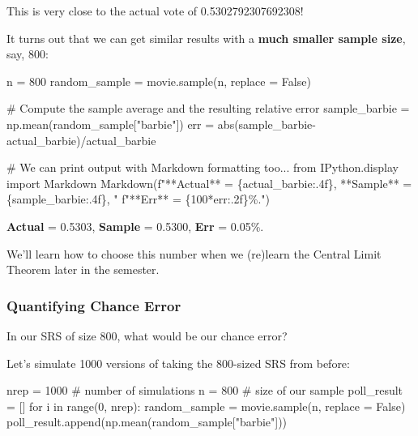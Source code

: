 \documentclass[
  letterpaper,
  DIV=11,
  numbers=noendperiod]{scrreprt}
\newenvironment{Shaded}{\begin{snugshade}}{\end{snugshade}}
\newcommand{\BuiltInTok}[1]{\textcolor[rgb]{0.00,0.23,0.31}{#1}}
\newcommand{\CommentTok}[1]{\textcolor[rgb]{0.37,0.37,0.37}{#1}}
\newcommand{\ControlFlowTok}[1]{\textcolor[rgb]{0.00,0.23,0.31}{#1}}
\newcommand{\DecValTok}[1]{\textcolor[rgb]{0.68,0.00,0.00}{#1}}
\newcommand{\ImportTok}[1]{\textcolor[rgb]{0.00,0.46,0.62}{#1}}
\newcommand{\KeywordTok}[1]{\textcolor[rgb]{0.00,0.23,0.31}{#1}}
\newcommand{\NormalTok}[1]{\textcolor[rgb]{0.00,0.23,0.31}{#1}}
\newcommand{\OperatorTok}[1]{\textcolor[rgb]{0.37,0.37,0.37}{#1}}
\newcommand{\SpecialCharTok}[1]{\textcolor[rgb]{0.37,0.37,0.37}{#1}}
\newcommand{\SpecialStringTok}[1]{\textcolor[rgb]{0.13,0.47,0.30}{#1}}
\newcommand{\StringTok}[1]{\textcolor[rgb]{0.13,0.47,0.30}{#1}}
\newcommand{\VariableTok}[1]{\textcolor[rgb]{0.07,0.07,0.07}{#1}}
\begin{document}
This is very close to the actual vote of 0.5302792307692308!

It turns out that we can get similar results with a \textbf{much smaller
sample size}, say, 800:

\begin{Shaded}
\begin{Highlighting}[]
\NormalTok{n }\OperatorTok{=} \DecValTok{800}
\NormalTok{random\_sample }\OperatorTok{=}\NormalTok{ movie.sample(n, replace }\OperatorTok{=} \VariableTok{False}\NormalTok{)}

\CommentTok{\# Compute the sample average and the resulting relative error}
\NormalTok{sample\_barbie }\OperatorTok{=}\NormalTok{ np.mean(random\_sample[}\StringTok{"barbie"}\NormalTok{])}
\NormalTok{err }\OperatorTok{=} \BuiltInTok{abs}\NormalTok{(sample\_barbie}\OperatorTok{{-}}\NormalTok{actual\_barbie)}\OperatorTok{/}\NormalTok{actual\_barbie}

\CommentTok{\# We can print output with Markdown formatting too...}
\ImportTok{from}\NormalTok{ IPython.display }\ImportTok{import}\NormalTok{ Markdown}
\NormalTok{Markdown(}\SpecialStringTok{f"**Actual** = }\SpecialCharTok{\{}\NormalTok{actual\_barbie}\SpecialCharTok{:.4f\}}\SpecialStringTok{, **Sample** = }\SpecialCharTok{\{}\NormalTok{sample\_barbie}\SpecialCharTok{:.4f\}}\SpecialStringTok{, "}
         \SpecialStringTok{f"**Err** = }\SpecialCharTok{\{}\DecValTok{100}\OperatorTok{*}\NormalTok{err}\SpecialCharTok{:.2f\}}\SpecialStringTok{\%."}\NormalTok{)}
\end{Highlighting}
\end{Shaded}

\textbf{Actual} = 0.5303, \textbf{Sample} = 0.5300, \textbf{Err} =
0.05\%.

We'll learn how to choose this number when we (re)learn the Central
Limit Theorem later in the semester.

\subsubsection{Quantifying Chance Error}\label{quantifying-chance-error}

In our SRS of size 800, what would be our chance error?

Let's simulate 1000 versions of taking the 800-sized SRS from before:

\begin{Shaded}
\begin{Highlighting}[]
\NormalTok{nrep }\OperatorTok{=} \DecValTok{1000}   \CommentTok{\# number of simulations}
\NormalTok{n }\OperatorTok{=} \DecValTok{800}       \CommentTok{\# size of our sample}
\NormalTok{poll\_result }\OperatorTok{=}\NormalTok{ []}
\ControlFlowTok{for}\NormalTok{ i }\KeywordTok{in} \BuiltInTok{range}\NormalTok{(}\DecValTok{0}\NormalTok{, nrep):}
\NormalTok{    random\_sample }\OperatorTok{=}\NormalTok{ movie.sample(n, replace }\OperatorTok{=} \VariableTok{False}\NormalTok{)}
\NormalTok{    poll\_result.append(np.mean(random\_sample[}\StringTok{"barbie"}\NormalTok{]))}
\end{Highlighting}
\end{Shaded}
\end{document}
